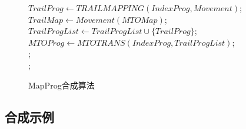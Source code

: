 \documentclass[design, pageheader]{njubachelor}
\begin{document}
\begin{figure}[!htbp]
\begin{ttmath}
\begin{algorithm*}[H]
{{{                    $TrailProg \leftarrow TRAILMAPPING(IndexProg, Movement)$;\\
                    $TrailMap \leftarrow Movement(MTOMap)$;\\
                    {
                        $TrailProgList \leftarrow TrailProgList \cup \{TrailProg\}$;\\
                    }
                }               
            }
            $MTOProg \leftarrow MTOTRANS(IndexProg, TrailProgList)$;\\
            {
                ;\\
            }
        }
        \Else
        {
            ;\\
        }
    \end{algorithm*}
    \end{ttmath}
    \caption{MapProg合成算法}
    \label{fig:map_prog_inference} 
\end{figure}

\subsection{合成示例}
\end{document}
